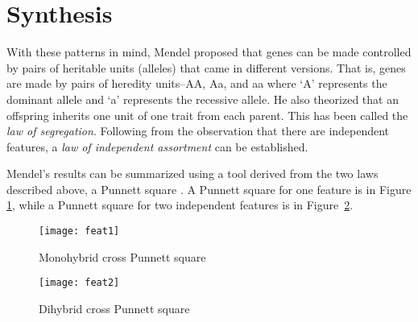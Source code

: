 \section{Synthesis}
With these patterns in mind, Mendel proposed that genes can be made controlled by pairs of heritable units (alleles) that came in different versions.
That is, genes are made by pairs of heredity units--AA, Aa, and aa where ‘A’ represents the dominant allele and ‘a’ represents the recessive allele.
He also theorized that an offspring inherits one unit of one trait from each parent.
This has been called the \emph{law of segregation}.
Following from the observation that there are independent features, a \emph{law of independent assortment} can be established.

Mendel's results can be summarized using a tool derived from the two laws described above, a Punnett square \cite{biomain}.
A Punnett square for one feature is in Figure \ref{fig:feat1}, while a Punnett square for two independent features is in Figure~\ref{fig:feat2}.

\begin{figure}[h]
    \centering
    \texttt{[image: feat1]}
    \caption{Monohybrid cross Punnett square}
    \label{fig:feat1}
\end{figure}

\begin{figure}[h]
    \centering
    \texttt{[image: feat2]}
    \caption{Dihybrid cross Punnett square}
    \label{fig:feat2}
\end{figure}

